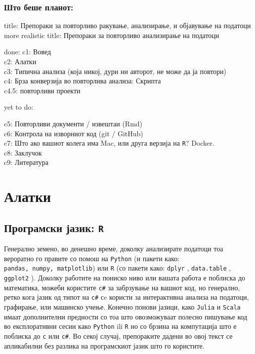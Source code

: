\documentclass[
]{book}
\begin{document}
\hypertarget{ux448ux442ux43e-ux431ux435ux448ux435-ux43fux43bux430ux43dux43eux442}{%
\subsection{Што беше планот:}\label{ux448ux442ux43e-ux431ux435ux448ux435-ux43fux43bux430ux43dux43eux442}}

title: Препораки за повторливо ракување, анализирање, и објавување на податоци\\
more realistic title: Препораки за повторливо анализирање на податоци

done:
c1: Вовед\\
c2: Алатки\\
c3: Типична анализа (која никој, дури ни авторот, не може да ја повтори)\\
c4: Брза конверзија во повторлива анализа: Скрипта\\
c4.5: повторливи проекти

yet to do:

c5: Повторливи документи / извештаи (Rmd)\\
c6: Контрола на изворниот код (git / GitHub)\\
c7: Што ако вашиот колега има Mac, или друга верзија на \texttt{R}? Docker.\\
c8: Заклучок\\
c9: Литература

\hypertarget{tools}{%
\chapter{Алатки}\label{tools}}

\hypertarget{ux43fux440ux43eux433ux440ux430ux43cux441ux43aux438-ux458ux430ux437ux438ux43a-r}{%
\section{\texorpdfstring{Програмски јазик: \texttt{R}}{Програмски јазик: R}}\label{ux43fux440ux43eux433ux440ux430ux43cux441ux43aux438-ux458ux430ux437ux438ux43a-r}}

Генерално земено, во денешно време, доколку анализирате податоци тоа вероратно го правите со помош на \texttt{Python} (и пакети како: \texttt{pandas,\ numpy,\ matplotlib}) или \texttt{R} (со пакети како: \texttt{dplyr} \citep{R-dplyr}, \texttt{data.table} \citep{R-data.table}, \texttt{ggplot2} \citep{R-ggplot2}). Доколку работите на пониско ниво или вашата работа е поблиска до математика, можеби користите \texttt{c\#} за забрзување на вашиот код, но генерално, ретко кога јазик од типот на \texttt{c\#} сe користи за интерактивна анализа на податоци, графирање, или машинско учење. Конечно понови јазици, како \texttt{Julia} и \texttt{Scala} имаат дополнителни предности со тоа што овозможуваат полесно пишување код во експлоративни сесии како \texttt{Python} ili \texttt{R} но со брзина на компутација што е поблиска до \texttt{c} или \texttt{c\#}. Во секој случај, препораките дадени во овој текст се апликабилни без разлика на програмскиот јазик што го користите.
\end{document}
